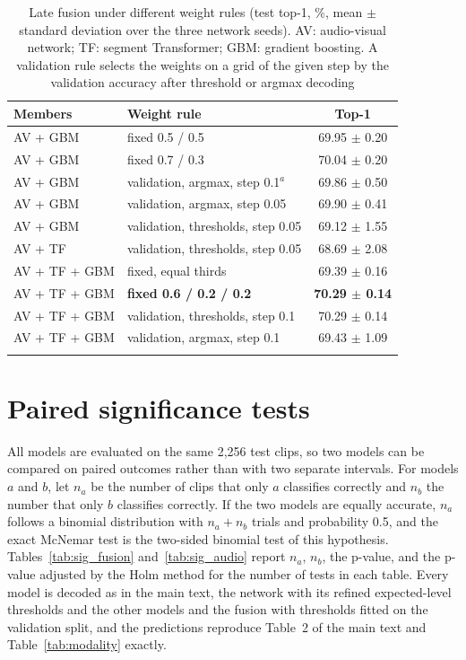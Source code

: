\documentclass[pdflatex,sn-basic]{sn-jnl}
\begin{document}
\begin{table}[t]
\caption{Late fusion under different weight rules (test top-1, \%, mean $\pm$ standard deviation over the three network seeds). AV: audio-visual network; TF: segment Transformer; GBM: gradient boosting. A validation rule selects the weights on a grid of the given step by the validation accuracy after threshold or argmax decoding}\label{tab:fusion}
\begin{tabular*}{0.8\textwidth}{@{\extracolsep\fill}llc}
\toprule
Members & Weight rule & Top-1\\
\midrule
AV + GBM & fixed 0.5 / 0.5 & 69.95 $\pm$ 0.20\\
AV + GBM & fixed 0.7 / 0.3 & 70.04 $\pm$ 0.20\\
AV + GBM & validation, argmax, step 0.1$^{a}$ & 69.86 $\pm$ 0.50\\
AV + GBM & validation, argmax, step 0.05 & 69.90 $\pm$ 0.41\\
AV + GBM & validation, thresholds, step 0.05 & 69.12 $\pm$ 1.55\\
AV + TF & validation, thresholds, step 0.05 & 68.69 $\pm$ 2.08\\
AV + TF + GBM & fixed, equal thirds & 69.39 $\pm$ 0.16\\
AV + TF + GBM & \textbf{fixed 0.6 / 0.2 / 0.2} & \textbf{70.29 $\pm$ 0.14}\\
AV + TF + GBM & validation, thresholds, step 0.1 & 70.29 $\pm$ 0.14\\
AV + TF + GBM & validation, argmax, step 0.1 & 69.43 $\pm$ 1.09\\
\botrule
\end{tabular*}
\end{table}

\section{Paired significance tests}\label{sec:s_sig}

All models are evaluated on the same 2,256 test clips, so two models can be compared on paired outcomes rather than with two separate intervals. For models $a$ and $b$, let $n_a$ be the number of clips that only $a$ classifies correctly and $n_b$ the number that only $b$ classifies correctly. If the two models are equally accurate, $n_a$ follows a binomial distribution with $n_a + n_b$ trials and probability 0.5, and the exact McNemar test is the two-sided binomial test of this hypothesis. Tables~\ref{tab:sig_fusion} and~\ref{tab:sig_audio} report $n_a$, $n_b$, the p-value, and the p-value adjusted by the Holm method for the number of tests in each table. Every model is decoded as in the main text, the network with its refined expected-level thresholds and the other models and the fusion with thresholds fitted on the validation split, and the predictions reproduce Table~2 of the main text and Table~\ref{tab:modality} exactly.
\end{document}
